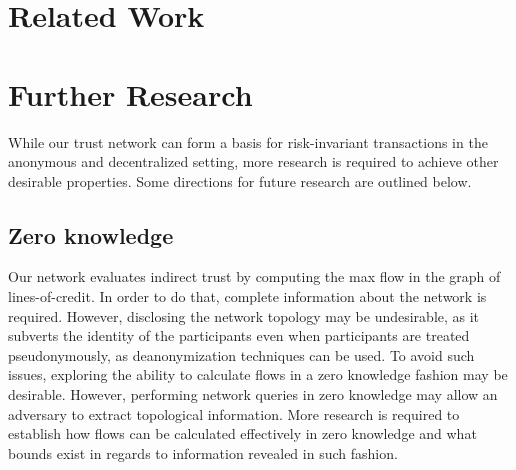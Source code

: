 \documentclass[11pt]{llncs}
\begin{document}
  \section{Related Work}

  \section{Further Research}

  While our trust network can form a basis for risk-invariant transactions in
  the anonymous and decentralized setting, more research is required to achieve
  other desirable properties. Some directions for future research are outlined
  below.

  \subsection{Zero knowledge}

  Our network evaluates indirect trust by computing the max flow in the graph
  of lines-of-credit. In order to do that, complete information about the
  network is required. However, disclosing the network topology may be
  undesirable, as it subverts the identity of the participants even when
  participants are treated pseudonymously, as deanonymization techniques can be
  used. To avoid such issues, exploring the ability to calculate flows in a
  zero knowledge fashion may be desirable. However, performing network queries
  in zero knowledge may allow an adversary to extract topological information.
  More research is required to establish how flows can be calculated
  effectively in zero knowledge and what bounds exist in regards to information
  revealed in such fashion.
\end{document}
